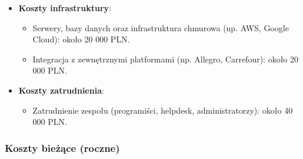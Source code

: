 \documentclass[12pt,a4paper]{article}
\begin{document}
\begin{itemize} 

\item \textbf{Koszty infrastruktury}: 
\begin{itemize}
    \item Serwery, bazy danych oraz infrastruktura chmurowa (np. AWS, Google Cloud): około 20 000 PLN.
    \item Integracja z zewnętrznymi platformami (np. Allegro, Carrefour): około 20 000 PLN.
\end{itemize}

\item \textbf{Koszty zatrudnienia}: 
\begin{itemize}
    \item Zatrudnienie zespołu (programiści, helpdesk, administratorzy): około 40 000 PLN.
\end{itemize}

\end{itemize}

\subsubsection*{Koszty bieżące (roczne)}
\end{document}
